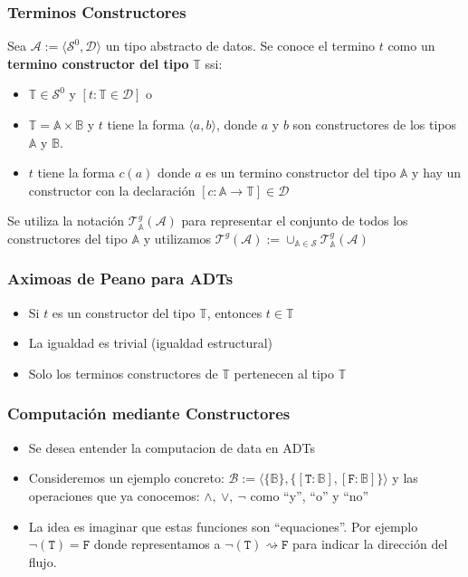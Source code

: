 \documentclass{beamer}
\begin{document}
\begin{frame}
\frametitle{Terminos Constructores}
Sea $\mathcal{A}:=\langle \mathcal{S}^0,\mathcal{D} \rangle$ un tipo abstracto de datos. Se conoce
el termino $t$ como un {\bf termino constructor del tipo} $\mathbb{T}$ ssi:
\begin{itemize}
    \item{$\mathbb{T}\in\mathcal{S}^0$ y $[t:\mathbb{T}\in\mathcal{D}]$ o}
    \item{$\mathbb{T}=\mathbb{A}\times\mathbb{B}$ y $t$ tiene la forma $\langle a,b \rangle$, donde
    $a$ y $b$ son constructores de los tipos $\mathbb{A}$ y $\mathbb{B}$.}
    \item{$t$ tiene la forma $c(a)$ donde $a$ es un termino constructor del tipo $\mathbb{A}$
    y hay un constructor con la declaraci\'on $[c:\mathbb{A}\rightarrow\mathbb{T}]\in\mathcal{D}$}
\end{itemize}
Se utiliza la notaci\'on $\mathcal{T}_{\mathbb{A}}^g(\mathcal{A})$ para representar el conjunto
de todos los constructores del tipo $\mathbb{A}$ y utilizamos
$\mathcal{T}^g(\mathcal{A}):=\cup_{\mathbb{A}\in\mathcal{S}}\mathcal{T}_{\mathbb{A}}^{g}(\mathcal{A})$

\end{frame}

\begin{frame}
\frametitle{Aximoas de Peano para ADTs}
\begin{itemize}
    \item{Si $t$ es un constructor del tipo $\mathbb{T}$, entonces $t\in\mathbb{T}$}
    \item{La igualdad es trivial (igualdad estructural)}
    \item{Solo los terminos constructores de $\mathbb{T}$ pertenecen al tipo $\mathbb{T}$}
\end{itemize}
\end{frame}

\begin{frame}
\frametitle{Computaci\'on mediante Constructores}
\begin{itemize}
    \item{Se desea entender la computacion de data en ADTs}
    \item{Consideremos un ejemplo concreto: $\mathcal{B}:=\langle \{\mathbb{B}\}, \{[\mathtt{T}:\mathbb{B}],
    [\mathtt{F}:\mathbb{B}]\}\rangle$ y las operaciones que ya conocemos: $\wedge,\ \vee,\ \neg$ como
    ``y'', ``o'' y ``no''}
    \item{La idea es imaginar que estas funciones son ``equaciones''. Por ejemplo $\neg(\mathtt{T})=\mathtt{F}$
    donde representamos a $\neg(\mathtt{T})\rightsquigarrow \mathtt{F}$ para indicar la direcci\'on del flujo.}
\end{itemize}
\end{frame}
\end{document}
